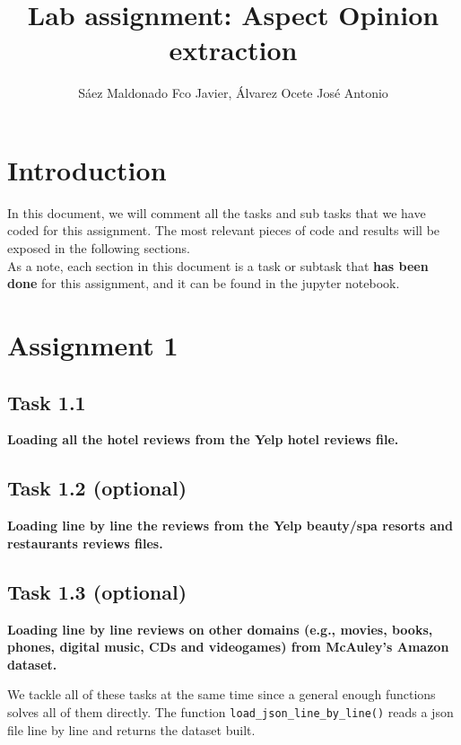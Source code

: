 \documentclass[11pt]{article}
\title{Lab assignment: Aspect Opinion extraction}
\author{Sáez Maldonado Fco Javier, Álvarez Ocete José Antonio}
\begin{document}
\maketitle

\section*{Introduction}

In this document, we will comment all the tasks and sub tasks that we have coded for this assignment. The most relevant pieces of code and results will be exposed in the following sections.\\

As a note, each section in this document is a task or subtask that \textbf{has been done} for this assignment, and it can be found in the jupyter notebook.



\hypertarget{assignment-1}{%
    \section{Assignment 1}\label{assignment-1}}

\hypertarget{task-1.1}{%
    \subsection{Task 1.1}\label{task-1.1}}

\textbf{Loading all the hotel reviews from the Yelp hotel reviews file.}

\hypertarget{task-1.2-optional}{%
    \subsection{Task 1.2 (optional)}\label{task-1.2-optional}}

\textbf{Loading line by line the reviews from the Yelp beauty/spa
    resorts and restaurants reviews files.}

\hypertarget{task-1.3-optional}{%
    \subsection{Task 1.3 (optional)}\label{task-1.3-optional}}

\textbf{Loading line by line reviews on other domains (e.g., movies,
    books, phones, digital music, CDs and videogames) from McAuley's Amazon
    dataset.}

We tackle all of these tasks at the same time since a general enough
functions solves all of them directly. The function
\texttt{load\_json\_line\_by\_line()} reads a json file line by line and
returns the dataset built.
\end{document}
